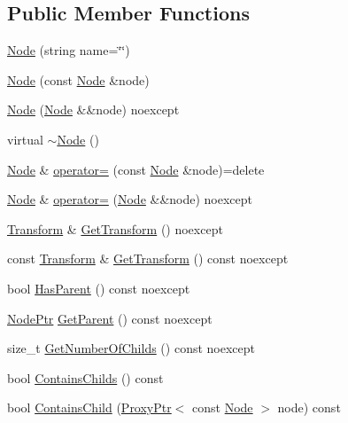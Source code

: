 \subsection*{Public Member Functions}
\begin{DoxyCompactItemize}
\item 
\hyperlink{classmage_1_1_node_a6638b75608b2b340743a0a639230492d}{Node} (string name=\char`\"{}\char`\"{})
\item 
\hyperlink{classmage_1_1_node_af9da591163469f210895f3a5b389d7cc}{Node} (const \hyperlink{classmage_1_1_node}{Node} \&node)
\item 
\hyperlink{classmage_1_1_node_a848ecb05c6b085cb4f27e38add85e64c}{Node} (\hyperlink{classmage_1_1_node}{Node} \&\&node) noexcept
\item 
virtual \hyperlink{classmage_1_1_node_a1369fc11b331abacbaf11aeb5729e871}{$\sim$\+Node} ()
\item 
\hyperlink{classmage_1_1_node}{Node} \& \hyperlink{classmage_1_1_node_ad10ea13608963acfa06d3c1577314da5}{operator=} (const \hyperlink{classmage_1_1_node}{Node} \&node)=delete
\item 
\hyperlink{classmage_1_1_node}{Node} \& \hyperlink{classmage_1_1_node_a10d0ed7f0ade94ce7cbd6f413ae82757}{operator=} (\hyperlink{classmage_1_1_node}{Node} \&\&node) noexcept
\item 
\hyperlink{classmage_1_1_transform}{Transform} \& \hyperlink{classmage_1_1_node_ad087f43f468552c7d4e2a4ea605b0220}{Get\+Transform} () noexcept
\item 
const \hyperlink{classmage_1_1_transform}{Transform} \& \hyperlink{classmage_1_1_node_aa8e2a3e9361dbdb4be23a8986f4ef082}{Get\+Transform} () const noexcept
\item 
bool \hyperlink{classmage_1_1_node_a2c1fe63ec1cb15321f0b0f5879227dcd}{Has\+Parent} () const noexcept
\item 
\hyperlink{classmage_1_1_node_ac575dc006e0ae1134277ade977dc06b6}{Node\+Ptr} \hyperlink{classmage_1_1_node_add9389d951ae864d7f92261398297089}{Get\+Parent} () const noexcept
\item 
size\+\_\+t \hyperlink{classmage_1_1_node_a975d92d3d93fe00d748c341198ddf02c}{Get\+Number\+Of\+Childs} () const noexcept
\item 
bool \hyperlink{classmage_1_1_node_afd885043a9de1b0c09d1eb0ef7bf6006}{Contains\+Childs} () const
\item 
bool \hyperlink{classmage_1_1_node_a2c1d85609b765c019a0a123f5f8a182a}{Contains\+Child} (\hyperlink{classmage_1_1_proxy_ptr}{Proxy\+Ptr}$<$ const \hyperlink{classmage_1_1_node}{Node} $>$ node) const

\end{DoxyCompactItemize}
